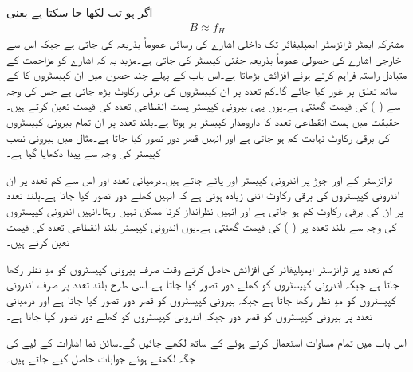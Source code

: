 اگر  ہو تب  لکھا جا سکتا ہے یعنی
\begin{align} \label{مساوات_تعددی_ردعمل_دائرہ_کارکردگی_الف}
B \approx f_H
\end{align}
مشترکہ ایمٹر ٹرانزسٹر ایمپلیفائر تک داخلی اشارے کی رسائی عموماً بذریعہ   کی جاتی ہے جبکہ اس سے خارجی اشارے کی حصولی عموماً بذریعہ جفتی کپیسٹر   کی جاتی ہے۔مزید یہ کہ    اشارے کو مزاحمت  کے متبادل راستہ فراہم کرتے ہوئے افزائش بڑھاتا ہے۔اس باب کے پہلے چند حصوں میں ان کپیسٹروں کا  کے ساتھ تعلق پر غور کیا جائے گا۔کم تعدد پر ان کپیسٹروں کی برقی رکاوٹ بڑھ جاتی ہے جس کی وجہ سے  (  )  کی قیمت گھٹتی ہے۔یوں یہی بیرونی کپیسٹر پست انقطاعی تعدد  کی قیمت  تعین کرتے ہیں۔حقیقت میں پست انقطاعی تعدد  کا دارومدار کپیسٹر  پر ہوتا ہے۔بلند تعدد پر ان تمام بیرونی کپیسٹروں کی برقی رکاوٹ نہایت کم ہو جاتی ہے اور انہیں قصر دور تصور کیا جاتا ہے۔مثال  میں بیرونی نصب کپیسٹر کی وجہ سے پیدا  دکھایا گیا ہے۔

ٹرانزسٹر کے   اور  جوڑ پر اندرونی کپیسٹر  اور  پائے جاتے ہیں۔درمیانی تعدد اور اس سے کم تعدد پر ان اندرونی کپیسٹروں کی برقی رکاوٹ اتنی زیادہ ہوتی ہے کہ انہیں کھلے دور تصور کیا جاتا ہے۔بلند تعدد پر ان کی برقی رکاوٹ کم ہو جاتی ہے اور انہیں نظرانداز کرنا ممکن نہیں رہتا۔انہیں اندرونی کپیسٹروں کی وجہ سے بلند تعدد پر  ( )  کی قیمت گھٹتی ہے۔یوں اندرونی کپیسٹر بلند انقطاعی تعدد  کی قیمت تعین کرتے ہیں۔

کم تعدد پر ٹرانزسٹر ایمپلیفائر کی افزائش حاصل کرتے وقت صرف بیرونی کپیسٹروں کو مدِ نظر رکھا جاتا ہے جبکہ اندرونی کپیسٹروں کو کھلے دور تصور کیا جاتا ہے۔اسی طرح بلند تعدد پر صرف اندرونی کپیسٹروں کو مدِ نظر رکھا جاتا ہے جبکہ بیرونی کپیسٹروں کو قصر دور تصور کیا جاتا ہے اور درمیانی تعدد پر بیرونی کپیسٹروں کو قصر دور جبکہ اندرونی کپیسٹروں کو کھلے دور تصور کیا جاتا ہے۔

اس باب میں تمام مساوات   استعمال کرتے ہوئے  کے ساتھ لکھے جائیں گے۔سائن نما اشارات کے لیے   کی جگہ  لکھتے ہوئے جوابات حاصل کیے جاتے ہیں۔
	
